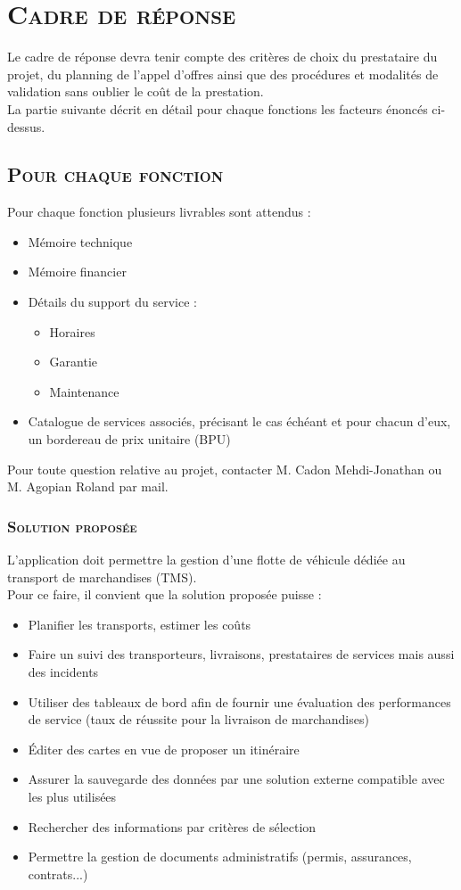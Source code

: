 \chapter{\textsc{Cadre de réponse}}
Le cadre de réponse devra tenir compte des critères de choix du prestataire du projet, du planning de l'appel d'offres ainsi que des procédures et modalités de validation sans oublier le coût de la prestation.
\\
La partie suivante décrit en détail pour chaque fonctions les facteurs énoncés ci-dessus.

\section{\textsc{Pour chaque fonction}}
Pour chaque fonction plusieurs livrables sont attendus :
\begin{itemize}[label=\textbullet]
 \item Mémoire technique
 \item Mémoire financier
 \item Détails du support du service :
 \begin{itemize}
  \item Horaires
  \item Garantie
 \item Maintenance
 \end{itemize}
 \item Catalogue de services associés, précisant le cas échéant et pour chacun d'eux, un bordereau de prix unitaire (BPU)
\end{itemize}
Pour toute question relative au projet, contacter M. Cadon Mehdi-Jonathan ou M. Agopian Roland par mail.

\subsection{\textsc{Solution proposée}}
L'application doit permettre la gestion d'une flotte de véhicule dédiée au transport de marchandises (TMS).
\\
Pour ce faire, il convient que la solution proposée puisse :
\begin{itemize}[label=\textbullet]
 \item Planifier les transports, estimer les coûts
 \item Faire un suivi des transporteurs, livraisons, prestataires de services mais aussi des incidents
 \item Utiliser des tableaux de bord afin de fournir une évaluation des performances de service (taux  de réussite pour la livraison de marchandises)
 \item Éditer des cartes en vue de proposer un itinéraire
 \item Assurer la sauvegarde des données par une solution externe compatible avec les plus utilisées
 \item Rechercher des informations par critères de sélection
 \item Permettre la gestion de documents administratifs (permis, assurances, contrats...)
\end{itemize}

